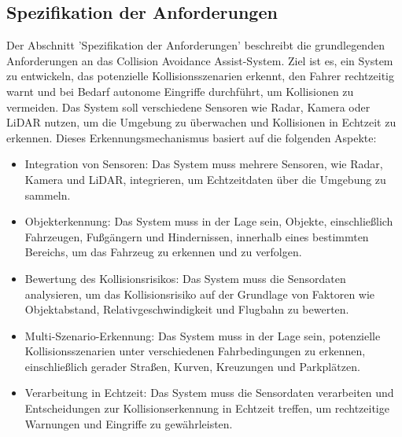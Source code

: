 \subsection{Spezifikation der Anforderungen}
Der Abschnitt 'Spezifikation der Anforderungen' beschreibt die grundlegenden Anforderungen an das Collision Avoidance Assist-System. Ziel ist es, ein System zu entwickeln, das potenzielle Kollisionsszenarien erkennt, den Fahrer rechtzeitig warnt und bei Bedarf autonome Eingriffe durchführt, um Kollisionen zu vermeiden. Das System soll verschiedene Sensoren wie Radar, Kamera oder LiDAR nutzen, um die Umgebung zu überwachen und Kollisionen in Echtzeit zu erkennen. Dieses Erkennungsmechanismus basiert auf die folgenden Aspekte:
\begin{itemize}
	\item Integration von Sensoren: Das System muss mehrere Sensoren, wie Radar, Kamera und LiDAR, integrieren, um Echtzeitdaten über die Umgebung zu sammeln.
	\item Objekterkennung: Das System muss in der Lage sein, Objekte, einschließlich Fahrzeugen, Fußgängern und Hindernissen, innerhalb eines bestimmten Bereichs, um das Fahrzeug zu erkennen und zu verfolgen.
	\item Bewertung des Kollisionsrisikos: Das System muss die Sensordaten analysieren, um das Kollisionsrisiko auf der Grundlage von Faktoren wie Objektabstand, Relativgeschwindigkeit und Flugbahn zu bewerten.
	\item Multi-Szenario-Erkennung: Das System muss in der Lage sein, potenzielle Kollisionsszenarien unter verschiedenen Fahrbedingungen zu erkennen, einschließlich gerader Straßen, Kurven, Kreuzungen und Parkplätzen.
	\item Verarbeitung in Echtzeit: Das System muss die Sensordaten verarbeiten und Entscheidungen zur Kollisionserkennung in Echtzeit treffen, um rechtzeitige Warnungen und Eingriffe zu gewährleisten.
\end{itemize}

